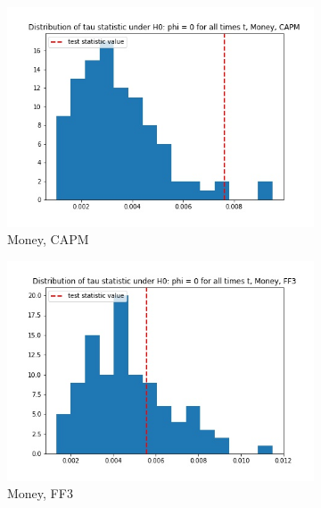 \documentclass{article}
\begin{document}
  \begin{figure}
  \centering
  \begin{subfigure}[b]{0.3\textwidth}
    \centering
    \includegraphics[width=\textwidth]{Money/tau_hist_02_CAPM.jpg}
    \caption{Money, CAPM}
    \label{fig:1}
  \end{subfigure}
  \begin{subfigure}[b]{0.3\textwidth}
    \centering
    \includegraphics[width=\textwidth]{Money/tau_hist_02_FF3.jpg}
    \caption{Money, FF3}
    \label{fig:2}
  \end{subfigure}
    \begin{subfigure}[b]{0.3\textwidth}
    \centering

\end{subfigure}
\end{figure}
\end{document}
